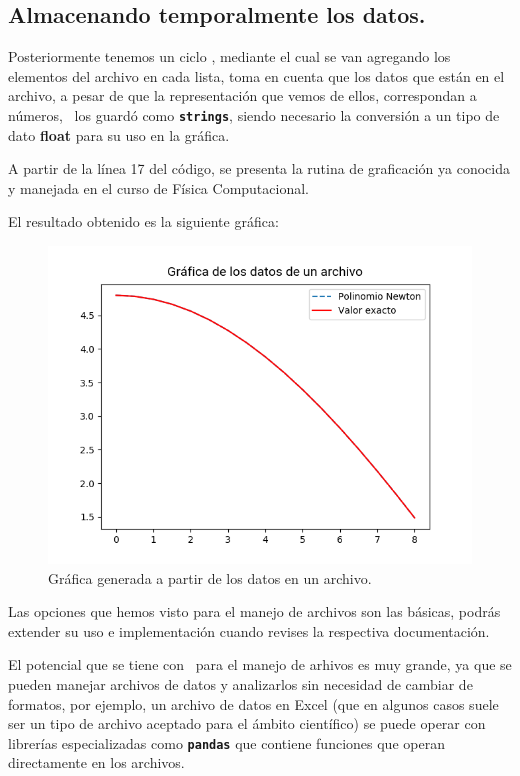 \subsection{Almacenando temporalmente los datos.}
Posteriormente tenemos un ciclo , mediante el cual se van agregando los elementos del archivo en cada lista, toma en cuenta que los datos que están en el archivo, a pesar de que la representación que vemos de ellos, correspondan a números, \python\ los guardó como \textbf{\texttt{strings}}, siendo necesario la conversión a un tipo de dato \textbf{float} para su uso en la gráfica.
\par
A partir de la línea 17 del código, se presenta la rutina de graficación ya conocida y manejada en el curso de Física Computacional.
\par
El resultado obtenido es la siguiente gráfica:
\begin{figure}[H]
\centering
\includegraphics[scale=0.9]{Imagenes/Archivos_01}
\caption{Gráfica generada a partir de los datos en un archivo.}
\end{figure}
Las opciones que hemos visto para el manejo de archivos son las básicas, podrás extender su uso e implementación cuando revises la respectiva documentación.
\par
El potencial que se tiene con \python\ para el manejo de arhivos es muy grande, ya que se pueden manejar archivos de datos y analizarlos sin necesidad de cambiar de formatos, por ejemplo, un archivo de datos en Excel (que en algunos casos suele ser un tipo de archivo aceptado para el ámbito científico) se puede operar con librerías especializadas como \texttt{\textbf{pandas}} que contiene funciones que operan directamente en los archivos.
 